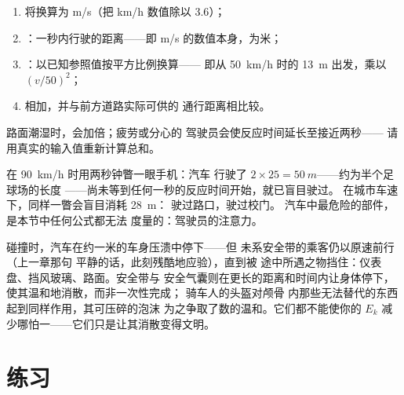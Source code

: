 \begin{method}[估算停车距离]\label{met:g9:kinetic-energy-safety:estimate}
\begin{enumerate}
  \item 将换算为 \unit{m/s}（把 \unit{km/h}
        数值除以 $3.6$）；
  \item {}：一秒内行驶的距离——即
        \unit{m/s} 的数值本身，为米；
  \item {}：以已知参照值按平方比例换算——
        即从 \qty{50}{km/h} 时的 \qty{13}{m} 出发，乘以
        $(v/50)^2$；
  \item 相加，并与前方道路实际可供的
        通行距离相比较。
\end{enumerate}
路面潮湿时，会加倍；疲劳或分心的
驾驶员会使反应时间延长至接近两秒——
请用真实的输入值重新计算总和。
\end{method}

\begin{example}[一瞥的代价]\label{ex:g9:kinetic-energy-safety:glance}
在 \qty{90}{km/h} 时用两秒钟瞥一眼手机：汽车
行驶了 $2 \times 25 = \qty{50}{m}$——约为半个足球场的长度
——尚未等到任何一秒的反应时间开始，就已盲目驶过。
在城市车速下，同样一瞥会盲目消耗 \qty{28}{m}：
驶过路口，驶过校门。
汽车中最危险的部件，是本节中任何公式都无法
度量的：驾驶员的注意力。
\end{example}

\begin{remark}\label{rem:g9:kinetic-energy-safety:belts}
碰撞时，汽车在约一米的车身压溃中停下——但
未系安全带的乘客仍以原速前行（上一章那句
平静的话，此刻残酷地应验），直到被
途中所遇之物挡住：仪表盘、挡风玻璃、路面。安全带与
安全气囊则在更长的距离和时间内让身体停下，
使其温和地消散，而非一次性完成；
骑车人的头盔对颅骨
内那些无法替代的东西起到同样作用，其可压碎的泡沫
为之争取了数的温和。它们都不能使你的
$E_k$ 减少哪怕一——它们只是让其消散变得文明。
\end{remark}

\section{练习}

